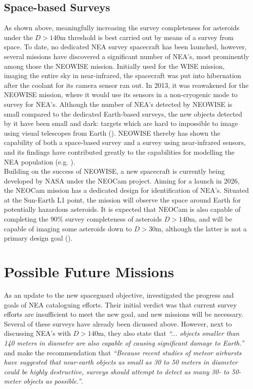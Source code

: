 \subsection{Space-based Surveys}
As shown above, meaningfully increasing the survey completeness for asteroids under the $D > 140 \mathrm{m}$ threshold is best carried out by means of a survey from space. To date, no dedicated NEA survey spacecraft has been launched, however, several missions have discovered a significant number of NEA's, most prominently among those the NEOWISE mission. Initially used for the WISE mission, imaging the entire sky in near-infrared, the spacecraft was put into hibernation after the coolant for its camera sensor ran out. In 2013, it was reawakened for the NEOWISE mission, where it would use its sensors in a non-cryogenic mode to survey for NEA's. Although the number of NEA's detected by NEOWISE is small compared to the dedicated Earth-based surveys, the new objects detected by it have been small and dark: targets which are hard to impossible to image using visual telescopes from Earth (\cite{NEOWISEResult}). NEOWISE thereby has shown the capability of both a space-based survey and a survey using near-infrared sensors, and its findings have contributed greatly to the capabilities for modelling the NEA population (e.g. \cite{GranvikPopulation}).\\

Building on the success of NEOWISE, a new spacecraft is currently being developed by NASA under the NEOCam project. Aiming for a launch in 2026, the NEOCam mission has a dedicated design for identification of NEA's. Situated at the Sun-Earth L1 point, the mission will observe the space around Earth for potentially hazardous asteroids. It is expected that NEOCam is also capable of completing the 90\% survey completeness of asteroids $D > 140 \mathrm{m}$, and will be capable of imaging some asteroids down to $D > 30 \mathrm{m}$, although the latter is not a primary design goal (\cite{NEOCam}).

\section{Possible Future Missions}
\label{sec:introductionproposals}
As an update to the new spaceguard objective, \cite{DefendingEarth} investigated the progress and goals of NEA cataloguing efforts. Their initial verdict was that current survey efforts are insufficient to meet the new goal, and new missions will be necessary. Several of these surveys have already been dicussed above. However, next to discussing NEA's with $D > 140 \mathrm{m}$, they also state that \textit{``... objects smaller than 140 meters in diameter are also capable of causing significant damage to Earth.''} and make the recommendation that \textit{``Because recent studies of meteor airbursts have suggested that near-earth objects as small as 30 to 50 meters in diameter could be highly destructive, surveys should attempt to detect as many 30- to 50-meter objects as possible.''}. \\

